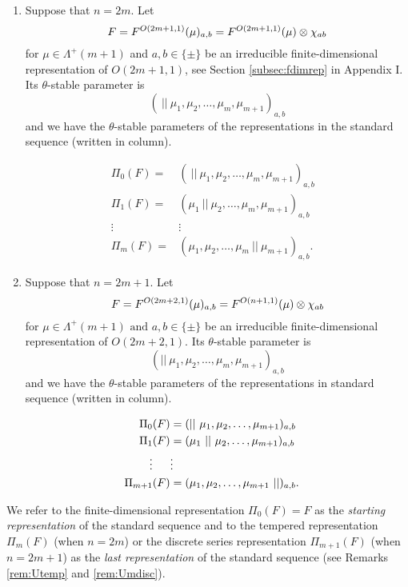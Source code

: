 \medskip
\noindent
\label{Hasse sequence} 
\begin{enumerate}
\item
Suppose that $n=2m$. 
Let 
\[
   F=
  F^{{O(2m+1,1)}}({\mu})_{a,b}
  = F^{{O(2m+1,1)}}({\mu}) \otimes \chi_{a b}
\]
 for $\mu \in \Lambda^+(m+1)$ and $a,b \in \{\pm\}$
 be an irreducible finite-dimensional representation
 of $O(2m+1,1)$, 
 see Section \ref{subsec:fdimrep} in Appendix I.  
Its $\theta$-stable parameter is 
\[
(~||~\mu_1,\mu_2,\dots, \mu_{m},\mu_{m+1})_{a,b}
\]
 and we have the $\theta$-stable parameters of the representations in the  standard sequence (written in column).

\begin{eqnarray*}
\Pi_0(F)=&  (~||~\mu_1,\mu_2,\dots, \mu_{m},\mu_{m+1})_{a,b} & \\
\Pi_1(F)=& (\mu_1~|| ~\mu_2,\dots, \mu_{m}, \mu_{m+1})_{a,b} & \\
\vdots\qquad &  \vdots   & \\
\Pi_m(F)=&  (\mu_1,\mu_2,\dots, \mu_{m}~||~ \mu_{m+1})_{a,b}.  & 
\end{eqnarray*}
\item
Suppose that $n=2m+1$.  
Let 
\[
   F=F^{{O(2m+2,1)}}({\mu})_{a,b} 
    = F^{{O(n+1,1)}}({\mu}) \otimes \chi_{ab} 
\]
   {for } $\mu \in \Lambda^+(m+1) \mbox{ and }
   a, b \in \{\pm\} $
 be an irreducible finite-dimensional representation of $O(2m+2,1)$.  
Its $\theta$-stable parameter is \[(||~\mu_1,\mu_2,\dots, \mu_{m},\mu_{m+1})_{a,b}\] 
and we have the $\theta$-stable parameters of the representations in standard sequence (written in column).

\begin{eqnarray*}
\Pi_0(F)&=  (||~\mu_1,\mu_2,\dots, \mu_{m+1})_{a,b} & 
\\
\Pi_1(F)&= (\mu_1~|| ~\mu_2,\dots, \mu_{m+1})_{a,b} & 
\\
\vdots\hphantom{mii} &  \vdots  &
\\
\Pi_{m+1}(F)&=  (\mu_1,\mu_2,\dots, \mu_{m+1}~|| )_{a,b}. & 
\end{eqnarray*}

\end{enumerate}

\medskip

We refer to the finite-dimensional representation
$\Pi_0(F)=F$
 as the {\it{starting representation}} of the standard sequence  
and to the tempered representation $\Pi_m(F)$
 (when $n=2m$)
 or the discrete series representation $\Pi_{m+1}(F)$
 (when $n=2m+1$)
 as the {\it{last representation}}
 of the standard sequence
 (see Remarks \ref{rem:Utemp} and \ref{rem:Umdisc}).

